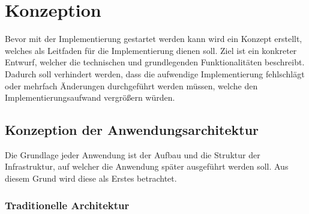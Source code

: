 \chapter{Konzeption}\label{cha:konzeption}
Bevor mit der Implementierung gestartet werden kann wird ein Konzept erstellt, welches als Leitfaden für die Implementierung dienen soll.
Ziel ist ein konkreter Entwurf, welcher die technischen und grundlegenden Funktionalitäten beschreibt.
Dadurch soll verhindert werden, dass die aufwendige Implementierung fehlschlägt oder mehrfach Änderungen durchgeführt werden müssen, welche den Implementierungsaufwand vergrößern würden.


















\section{Konzeption der Anwendungsarchitektur}
Die Grundlage jeder Anwendung ist der Aufbau und die Struktur der Infrastruktur, auf welcher die Anwendung später ausgeführt werden soll.
Aus diesem Grund wird diese als Erstes betrachtet.

\subsection{Traditionelle Architektur}

